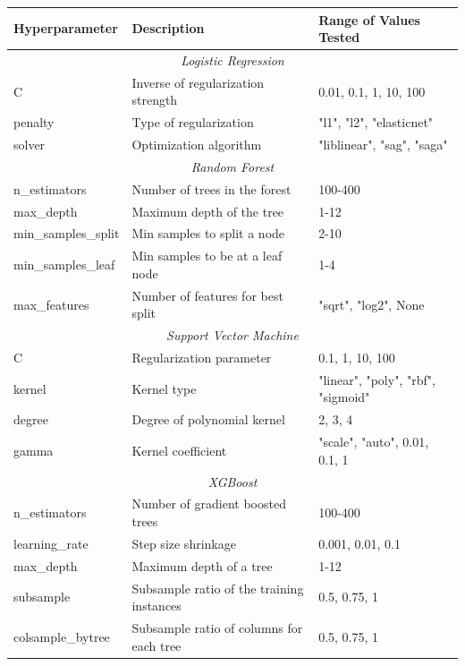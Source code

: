  \begin{table}[h]
 	\centering
 	\small
 	\begin{adjustbox}{center}
 	\begin{tabular}{|l|l|l|}
 		\hline
 		\rule{0pt}{2.5ex}\textbf{Hyperparameter} & \textbf{Description} & \textbf{Range of Values Tested} \\
 		\hline
 		\multicolumn{3}{|c|}{\rule{0pt}{2.5ex}\textit{Logistic Regression}} \\
 		\hline
 		C & Inverse of regularization strength & 0.01, 0.1, 1, 10, 100 \\
 		penalty & Type of regularization & "l1", "l2", "elasticnet" \\
 		solver & Optimization algorithm & "liblinear", "sag", "saga" \\
 		\hline
 		\multicolumn{3}{|c|}{\rule{0pt}{2.5ex}\textit{Random Forest}} \\
 		\hline
 		n\_estimators & Number of trees in the forest & 100-400 \\
 		max\_depth & Maximum depth of the tree & 1-12 \\
 		min\_samples\_split & Min samples to split a node & 2-10 \\
 		min\_samples\_leaf & Min samples to be at a leaf node & 1-4 \\
 		max\_features & Number of features for best split & "sqrt", "log2", None \\
 		\hline
 		\multicolumn{3}{|c|}{\rule{0pt}{2.5ex}\textit{Support Vector Machine}} \\
 		\hline
 		C & Regularization parameter & 0.1, 1, 10, 100 \\
 		kernel & Kernel type & "linear", "poly", "rbf", "sigmoid" \\
 		degree & Degree of polynomial kernel & 2, 3, 4 \\
 		gamma & Kernel coefficient & "scale", "auto", 0.01, 0.1, 1 \\
 		\hline
 		\multicolumn{3}{|c|}{\rule{0pt}{2.5ex}\textit{XGBoost}} \\
 		\hline
 		n\_estimators & Number of gradient boosted trees & 100-400 \\
 		learning\_rate & Step size shrinkage & 0.001, 0.01, 0.1 \\
 		max\_depth & Maximum depth of a tree & 1-12 \\
 		subsample & Subsample ratio of the training instances & 0.5, 0.75, 1 \\
 		colsample\_bytree & Subsample ratio of columns for each tree & 0.5, 0.75, 1 \\

\end{tabular}
\end{adjustbox}
\end{table}
